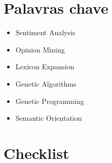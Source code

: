 \documentclass[a4paper,11pt]{article}
\begin{document}
\section{Palavras chave}
\begin{itemize}
	\item{Sentiment Analysis}
	\item{Opinion Mining}
	\item{Lexicon Expansion}
	\item{Genetic Algorithms}
	\item{Genetic Programming}
	\item{Semantic Orientation}
\end{itemize}

\section{Checklist}
\end{document}
